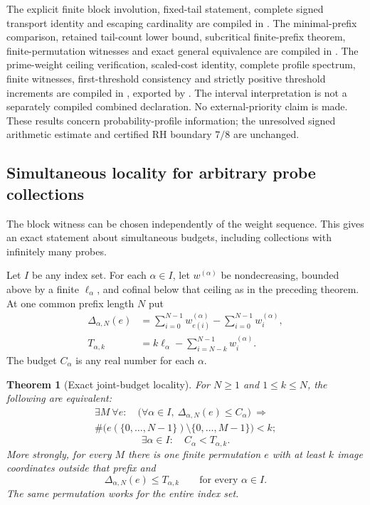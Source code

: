 \documentclass[11pt]{article}
\newtheorem{theorem}{Theorem}[section]
\theoremstyle{definition}
\begin{document}
\begin{flushleft}
The explicit finite block involution, fixed-tail statement,
complete signed transport identity and escaping cardinality
are compiled in
.
The minimal-prefix comparison, retained tail-count lower bound,
subcritical finite-prefix theorem, finite-permutation witnesses
and exact general equivalence are compiled in
.
The prime-weight ceiling verification, scaled-cost identity,
complete profile spectrum, finite witnesses, first-threshold
consistency and strictly positive threshold increments are
compiled in
, exported by
.
The interval interpretation is not a separately compiled
combined declaration. No external-priority claim is made.
These results concern probability-profile information; the
unresolved signed arithmetic estimate and certified RH
boundary $7/8$ are unchanged.
\end{flushleft}


\clearpage
\subsection{Simultaneous locality for arbitrary probe collections}

The block witness can be chosen independently of the weight
sequence. This gives an exact statement about simultaneous
budgets, including collections with infinitely many probes.

Let $I$ be any index set. For each $\alpha\in I$, let
$w^{(\alpha)}$ be nondecreasing, bounded above by a finite
$\ell_\alpha$, and cofinal below that ceiling as in the
preceding theorem. At one common prefix length $N$ put
\[
 \begin{split}
 \Delta_{\alpha,N}(e)
   &=\sum_{i=0}^{N-1}w^{(\alpha)}_{e(i)}
                        -\sum_{i=0}^{N-1}w^{(\alpha)}_i,\\
 T_{\alpha,k}
   &=k\ell_\alpha-
       \sum_{i=N-k}^{N-1}w^{(\alpha)}_i.
 \end{split}
\]
The budget $C_\alpha$ is any real number for each $\alpha$.

\begin{theorem}[Exact joint-budget locality]
For $N\ge1$ and $1\le k\le N$, the following are equivalent:
\[
 \begin{gathered}
 \exists M\ \forall e:\quad
 \bigl(\forall\alpha\in I,\
          \Delta_{\alpha,N}(e)\le C_\alpha\bigr)
       \ \Longrightarrow\\
 \#\bigl(e(\{0,\ldots,N-1\})\setminus\{0,\ldots,M-1\}\bigr)<k;
 \end{gathered}
\]
\[
 \exists\alpha\in I:\quad C_\alpha<T_{\alpha,k}.
\]
More strongly, for every $M$ there is one finite permutation $e$
with at least $k$ image coordinates outside that prefix and
\[
 \Delta_{\alpha,N}(e)\le T_{\alpha,k}
       \qquad\text{for every }\alpha\in I.
\]
The same permutation works for the entire index set.
\end{theorem}
\end{document}
